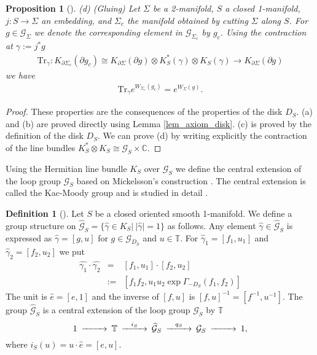 \documentclass[a4paper,a4paper]{article}
\newtheorem{prop}[thm]{Proposition}
\theoremstyle{definition}
\newtheorem{dfn}[thm]{Definition}
\theoremstyle{remark}
\newcommand{\C}{\mathbb{C}}
\newcommand{\T}{\mathbb{T}}
\newcommand{\G}{\mathcal{G}}
\newcommand{\Tr}{\mathrm{Tr}}
\def\h#1{ \widehat{#1} }
\begin{document}
\begin{prop}[\cite{F1}]
(d) (Gluing) Let $\Sigma$ be a 2-manifold, $S$ a closed 1-manifold, $j : S \to \Sigma$ an embedding, and $\Sigma_c$ the manifold obtained by cutting $\Sigma$ along $S$. For $g \in \G_\Sigma$ we denote the corresponding element in $\G_{\Sigma_c}$ by $g_c$. Using the contraction at $\gamma := j^*g$
\begin{eqnarray}
\Tr_\gamma : K_{\partial \Sigma_c}(\partial g_c) \cong 
K_{\partial \Sigma}(\partial g) \otimes K_S^*(\gamma) \otimes K_S(\gamma)
\rightarrow K_{\partial \Sigma}(\partial g) 
\end{eqnarray}
we have
\begin{eqnarray}
\Tr_\gamma e^{ W_{\Sigma_c}(g_c) } = e^{ W_\Sigma(g) } .
\end{eqnarray}
\end{prop}

\begin{proof}
These properties are the consequences of the properties of the disk $D_S$. (a) and (b) are proved directly using Lemma \ref{lem_axiom_disk}. (c) is proved by the definition of the disk $D_S$. We can prove (d) by writing explicitly the contraction of the line bundles $K_S^* \otimes K_S \cong \G_S \times \C$.
\end{proof}

Using the Hermitian line bundle $K_S$ over $\G_S$ we define the central extension of the loop group $\G_S$ based on Mickelsson's construction \cite{Mi}. The central extension is called the Kac-Moody group and is studied in detail \cite{P-S}. 

\begin{dfn}[\cite{Mi}] \label{dfn_KM_group}
Let $S$ be a closed oriented smooth 1-manifold. We define a group structure on
$\h{\G}_S = \{ \h{\gamma} \in K_S |\ |\h{\gamma}| = 1  \}$
as follows. Any element $\h{\gamma} \in \h{\G}_S$ is expressed as $\h{\gamma} = [g, u]$ for $g \in \G_{D_S}$ and $u \in \T$. For $\h{\gamma}_1 = [f_1, u_1]$ and $\h{\gamma}_2 = [f_2, u_2]$ we put
\begin{eqnarray*}
\h{\gamma_1} \cdot \h{\gamma_2} 
& = & 
[f_1, u_1] \cdot [f_2, u_2]  \\
& := &
[f_1 f_2, u_1 u_2 \exp \Gamma_{-D_S}(f_1, f_2)]
\end{eqnarray*}
The unit is $\hat{e} = [e, 1]$ and the inverse of $[f, u]$ is $[f, u]^{-1} = [f^{-1}, u^{-1}]$. The group $\h{\G}_S$ is a central extension of the loop group $\G_S$ by $\T$
$$
\begin{CD}
1 @>>> \T @>i_S>> \h{\G}_S @>q_S>> \G_S @>>>1 ,
\end{CD}
$$
where $i_S(u) = u \cdot \hat{e} = [e, u]$.
\end{dfn}
\end{document}
